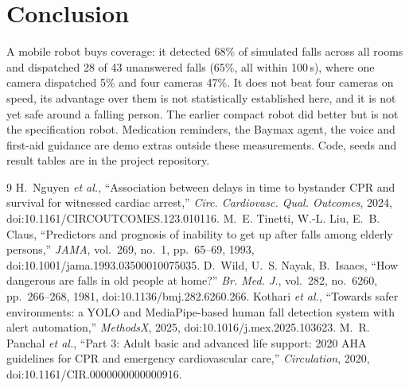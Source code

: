 \documentclass[11pt,twocolumn]{article}
\begin{document}
\section{Conclusion}
A mobile robot buys coverage: it detected 68\% of simulated falls across all rooms and dispatched 28 of 43 unanswered falls (65\%, all within 100\,s), where one camera dispatched 5\% and four cameras 47\%. It does not beat four cameras on speed, its advantage over them is not statistically established here, and it is not yet safe around a falling person. The earlier compact robot did better but is not the specification robot. Medication reminders, the Baymax agent, the voice and first-aid guidance are demo extras outside these measurements. Code, seeds and result tables are in the project repository.
\begin{thebibliography}{9}\footnotesize
{}H.~Nguyen \emph{et al.}, ``Association between delays in time to bystander CPR and survival for witnessed cardiac arrest,'' \emph{Circ. Cardiovasc. Qual. Outcomes}, 2024, doi:10.1161/CIRCOUTCOMES.123.010116.
M.~E. Tinetti, W.-L. Liu, E.~B. Claus, ``Predictors and prognosis of inability to get up after falls among elderly persons,'' \emph{JAMA}, vol.~269, no.~1, pp.~65--69, 1993, doi:10.1001/jama.1993.03500010075035.
D.~Wild, U.~S. Nayak, B.~Isaacs, ``How dangerous are falls in old people at home?'' \emph{Br. Med. J.}, vol.~282, no.~6260, pp.~266--268, 1981, doi:10.1136/bmj.282.6260.266.
Kothari \emph{et al.}, ``Towards safer environments: a YOLO and MediaPipe-based human fall detection system with alert automation,'' \emph{MethodsX}, 2025, doi:10.1016/j.mex.2025.103623.
M.~R. Panchal \emph{et al.}, ``Part 3: Adult basic and advanced life support: 2020 AHA guidelines for CPR and emergency cardiovascular care,'' \emph{Circulation}, 2020, doi:10.1161/CIR.0000000000000916.
\end{thebibliography}
\end{document}
